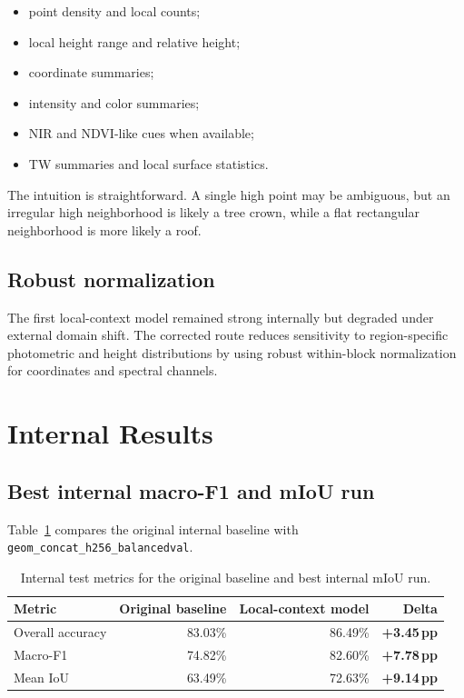 \documentclass[11pt,a4paper]{article}
\newcommand{\pp}{\,pp}
\newcommand{\modelinternal}{\texttt{geom\_concat\_h256\_balancedval}}
\newcommand{\good}[1]{\textcolor{evogreen}{\textbf{#1}}}
\begin{document}
\begin{itemize}
  \item point density and local counts;
  \item local height range and relative height;
  \item coordinate summaries;
  \item intensity and color summaries;
  \item NIR and NDVI-like cues when available;
  \item TW summaries and local surface statistics.
\end{itemize}

The intuition is straightforward. A single high point may be ambiguous, but an irregular high neighborhood is likely a tree crown, while a flat rectangular neighborhood is more likely a roof.

\subsection{Robust normalization}

The first local-context model remained strong internally but degraded under external domain shift. The corrected route reduces sensitivity to region-specific photometric and height distributions by using robust within-block normalization for coordinates and spectral channels.

\section{Internal Results}

\subsection{Best internal macro-F1 and mIoU run}

Table~\ref{tab:internal-main} compares the original internal baseline with \modelinternal.

\begin{table}[ht]
\centering
\caption{Internal test metrics for the original baseline and best internal mIoU run.}
\label{tab:internal-main}
\begin{tabular}{lrrr}
\toprule
Metric & Original baseline & Local-context model & Delta \\
\midrule
Overall accuracy & 83.03\% & 86.49\% & \good{+3.45\pp} \\
Macro-F1 & 74.82\% & 82.60\% & \good{+7.78\pp} \\
Mean IoU & 63.49\% & 72.63\% & \good{+9.14\pp} \\
\bottomrule
\end{tabular}
\end{table}
\end{document}
